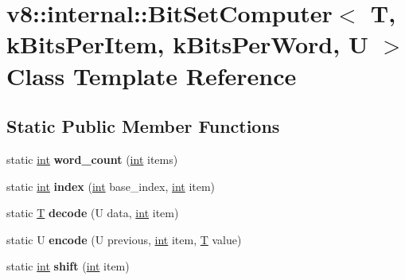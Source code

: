 \hypertarget{classv8_1_1internal_1_1BitSetComputer}{}\section{v8\+:\+:internal\+:\+:Bit\+Set\+Computer$<$ T, k\+Bits\+Per\+Item, k\+Bits\+Per\+Word, U $>$ Class Template Reference}
\label{classv8_1_1internal_1_1BitSetComputer}
\subsection*{Static Public Member Functions}
\begin{DoxyCompactItemize}
\item 
\mbox{\label{classv8_1_1internal_1_1BitSetComputer_a510fc37b902e73b5cbbe471ab6ce2c15}} 
static \mbox{\hyperlink{classint}{int}} {\bfseries word\+\_\+count} (\mbox{\hyperlink{classint}{int}} items)
\item 
\mbox{\label{classv8_1_1internal_1_1BitSetComputer_a65f33303316c784bb461bca14603b379}} 
static \mbox{\hyperlink{classint}{int}} {\bfseries index} (\mbox{\hyperlink{classint}{int}} base\+\_\+index, \mbox{\hyperlink{classint}{int}} item)
\item 
\mbox{\label{classv8_1_1internal_1_1BitSetComputer_a6b1768318b19d71f2c8f90524c4a3c15}} 
static \mbox{\hyperlink{classv8_1_1internal_1_1torque_1_1T}{T}} {\bfseries decode} (U data, \mbox{\hyperlink{classint}{int}} item)
\item 
\mbox{\label{classv8_1_1internal_1_1BitSetComputer_a44fa109f0b4c0c7c13130ebd14708add}} 
static U {\bfseries encode} (U previous, \mbox{\hyperlink{classint}{int}} item, \mbox{\hyperlink{classv8_1_1internal_1_1torque_1_1T}{T}} value)
\item 
\mbox{\label{classv8_1_1internal_1_1BitSetComputer_ab63eae7e3c886f4a5194024e056bc561}} 
static \mbox{\hyperlink{classint}{int}} {\bfseries shift} (\mbox{\hyperlink{classint}{int}} item)
\end{DoxyCompactItemize}
